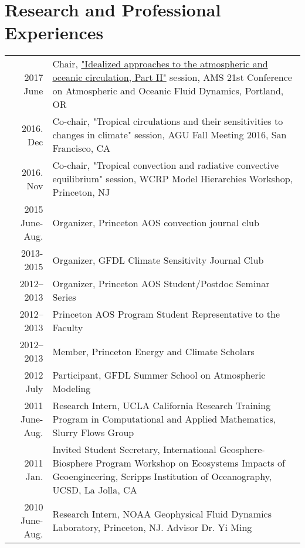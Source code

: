 \documentclass[12pt,letterpaper]{shillcv}
\begin{document}
\section*{Research and Professional Experiences}
\label{sec:org52489e0}
\begin{center}
\begin{tabularx}{\textwidth}{rX}
2017 June & Chair, \href{https://ams.confex.com/ams/21Fluid19Middle/webprogram/Session43327.html}{"Idealized approaches to the atmospheric and oceanic circulation, Part II"} session, AMS 21st Conference on Atmospheric and Oceanic Fluid Dynamics, Portland, OR\\
2016. Dec & Co-chair, "Tropical circulations and their sensitivities to changes in climate" session, AGU Fall Meeting 2016, San Francisco, CA\\
2016. Nov & Co-chair, "Tropical convection and radiative convective equilibrium" session, WCRP Model Hierarchies Workshop, Princeton, NJ\\
2015 June-Aug. & Organizer, Princeton AOS convection journal club\\
2013-2015 & Organizer, GFDL Climate Sensitivity Journal Club\\
2012–2013 & Organizer, Princeton AOS Student/Postdoc Seminar Series\\
2012–2013 & Princeton AOS Program Student Representative to the Faculty\\
2012–2013 & Member, Princeton Energy and Climate Scholars\\
2012 July & Participant, GFDL Summer School on Atmospheric Modeling\\
2011 June-Aug. & Research Intern, UCLA California Research Training Program in Computational and Applied Mathematics, Slurry Flows Group\\
2011 Jan. & Invited Student Secretary, International Geosphere-Biosphere Program Workshop on Ecosystems Impacts of Geoengineering, Scripps Institution of Oceanography, UCSD, La Jolla, CA\\
2010 June-Aug. & Research Intern, NOAA Geophysical Fluid Dynamics Laboratory, Princeton, NJ. Advisor Dr. Yi Ming\\
\end{tabularx}
\end{center}
\end{document}
